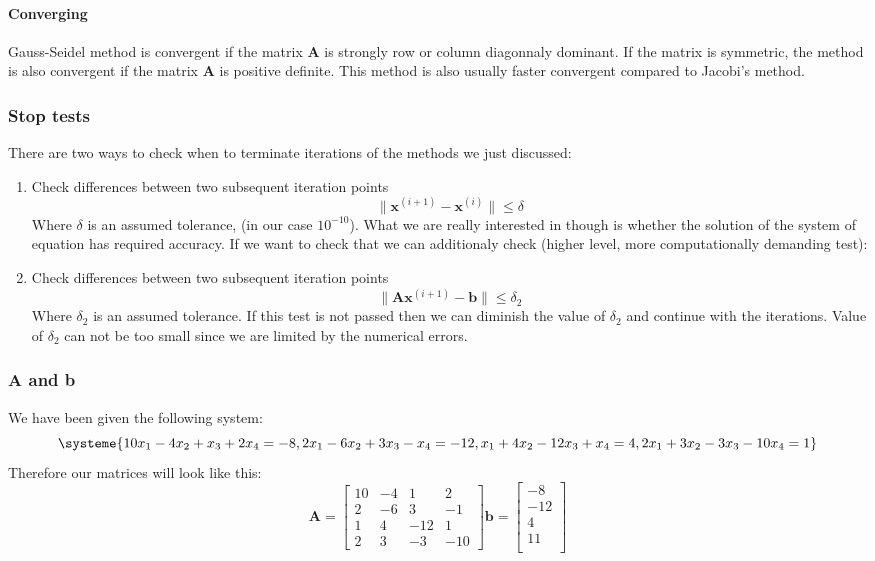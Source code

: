 \documentclass[12pt]{report}
\begin{document}
\paragraph{Converging}
Gauss-Seidel method is convergent if the matrix \textbf{A} is strongly row or column diagonnaly dominant. If the matrix is symmetric, the method is also convergent if the matrix \textbf{A} is positive definite. This method is also usually faster convergent compared to Jacobi's method.

\newpage
\subsubsection{Stop tests}
There are two ways to check when to terminate iterations of the methods we just discussed:
\begin{enumerate}
\item Check differences between two subsequent iteration points
\[
\| \mathbf{x}^{(i+1)} - \mathbf{x}^{(i)} \| \leq \delta
\]
Where $\delta$ is an assumed tolerance, (in our case $10^{-10}$). What we are really interested in though is whether the solution of the system of equation has required accuracy. If we want to check that we can additionaly check (higher level, more computationally demanding test):
\item Check differences between two subsequent iteration points
\[
\| \mathbf{A}\mathbf{x}^{(i+1)} - \mathbf{b}\| \leq \delta_2
\]
Where $\delta_2$ is an assumed tolerance. If this test is not passed then we can diminish the value of $\delta_2$ and continue with the iterations. Value of $\delta_2$ can not be too small since we are limited by the numerical errors.
\end{enumerate}

\newpage
\subsubsection{\textbf{A} and \textbf{b}}
We have been given the following system:
\[
\systeme{10x_1-4x_2+x_3+2x_4=-8, 2x_1-6x_2+3x_3-x_4=-12, x_1+4x_2-12x_3+x_4=4, 2x_1+3x_2-3x_3-10x_4=1}
\]
Therefore our matrices will look like this:
\[
\textbf{A} = \begin{bmatrix}
10 & -4 & 1 & 2 \\
2 & -6 & 3 & -1 \\
1 & 4 & -12 & 1 \\
2 & 3 & -3 & -10
\end{bmatrix}
\textbf{b} = \begin{bmatrix}
-8 \\
-12 \\
4 \\
11 \\
\end{bmatrix}
\]
\end{document}
